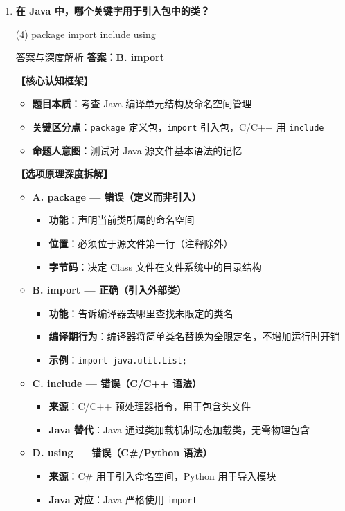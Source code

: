 \documentclass[12pt, a4paper]{ctexart}
\newcommand{\code}[1]{\texttt{#1}}
\begin{document}
\begin{enumerate}[label=\textbf{\arabic*.}, leftmargin=*, itemsep=1.5em]
\item \textbf{在 Java 中，哪个关键字用于引入包中的类？}
\begin{tasks}(4)
    \task package \task import \task include \task using
\end{tasks}
\begin{bluebox}{答案与深度解析}
\textbf{答案：B. import}

\textbf{【核心认知框架】}
\begin{itemize}[leftmargin=*, nosep]
    \item \textbf{题目本质}：考查 Java 编译单元结构及命名空间管理
    \item \textbf{关键区分点}：\code{package} 定义包，\code{import} 引入包，C/C++ 用 \code{include}
    \item \textbf{命题人意图}：测试对 Java 源文件基本语法的记忆
\end{itemize}

\textbf{【选项原理深度拆解】}
\begin{itemize}[leftmargin=*, nosep]
    \item \textbf{A. package — 错误（定义而非引入）}
    \begin{itemize}[leftmargin=*, nosep]
        \item \textbf{功能}：声明当前类所属的命名空间
        \item \textbf{位置}：必须位于源文件第一行（注释除外）
        \item \textbf{字节码}：决定 Class 文件在文件系统中的目录结构
    \end{itemize}
    \item \textbf{B. import — 正确（引入外部类）}
    \begin{itemize}[leftmargin=*, nosep]
        \item \textbf{功能}：告诉编译器去哪里查找未限定的类名
        \item \textbf{编译期行为}：编译器将简单类名替换为全限定名，不增加运行时开销
        \item \textbf{示例}：\code{import java.util.List;}
    \end{itemize}
    \item \textbf{C. include — 错误（C/C++ 语法）}
    \begin{itemize}[leftmargin=*, nosep]
        \item \textbf{来源}：C/C++ 预处理器指令，用于包含头文件
        \item \textbf{Java 替代}：Java 通过类加载机制动态加载类，无需物理包含
    \end{itemize}
    \item \textbf{D. using — 错误（C\#/Python 语法）}
    \begin{itemize}[leftmargin=*, nosep]
        \item \textbf{来源}：C\# 用于引入命名空间，Python 用于导入模块
        \item \textbf{Java 对应}：Java 严格使用 \code{import}
    \end{itemize}
\end{itemize}


\end{bluebox}
\end{enumerate}
\end{document}
